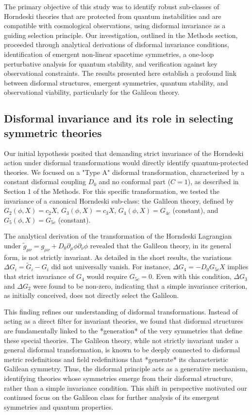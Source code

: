 \documentclass[twocolumn]{aastex631}
\begin{document}
The primary objective of this study was to identify robust sub-classes of Horndeski theories that are protected from quantum instabilities and are compatible with cosmological observations, using disformal invariance as a guiding selection principle. Our investigation, outlined in the Methods section, proceeded through analytical derivations of disformal invariance conditions, identification of emergent non-linear spacetime symmetries, a one-loop perturbative analysis for quantum stability, and verification against key observational constraints. The results presented here establish a profound link between disformal structures, emergent symmetries, quantum stability, and observational viability, particularly for the Galileon theory.

\subsection{Disformal invariance and its role in selecting symmetric theories}
Our initial hypothesis posited that demanding strict invariance of the Horndeski action under disformal transformations would directly identify quantum-protected theories. We focused on a "Type A" disformal transformation, characterized by a constant disformal coupling $D_0$ and no conformal part ($C=1$), as described in Section 1 of the Methods. For this specific transformation, we tested the invariance of a canonical Horndeski sub-class: the Galileon theory, defined by $G_2(\phi, X) = c_2 X$, $G_3(\phi, X) = c_3 X$, $G_4(\phi, X) = G_{4c}$ (constant), and $G_5(\phi, X) = G_{5c}$ (constant).

The analytical derivation of the transformation of the Horndeski Lagrangian under $\tilde{g}_{\mu\nu} = g_{\mu\nu} + D_0 \partial_\mu \phi \partial_\nu \phi$ revealed that the Galileon theory, in its general form, is not strictly invariant. As detailed in the short results, the variations $\Delta G_i = \tilde{G}_i - G_i$ did not universally vanish. For instance, $\Delta G_4 = -D_0 G_{5c} X$ implies that strict invariance of $G_4$ would require $G_{5c}=0$. Even with this condition, $\Delta G_3$ and $\Delta G_2$ were found to be non-zero, indicating that a simple invariance criterion, as initially conceived, does not directly select the Galileon.

This finding refines our understanding of disformal transformations. Instead of acting as a direct filter for invariant theories, we found that disformal structures are fundamentally linked to the *generation* of the very symmetries that define these special theories. The Galileon theory, while not strictly invariant under a general disformal transformation, is known to be deeply connected to disformal metric redefinitions and field redefinitions that *generate* its characteristic Galilean symmetry. Thus, the disformal principle acts as a generative mechanism, identifying theories whose symmetries emerge from their disformal structure, rather than a simple invariance condition. This shift in perspective motivated our continued focus on the Galileon class for further analysis of its emergent symmetries and quantum properties.
\end{document}
